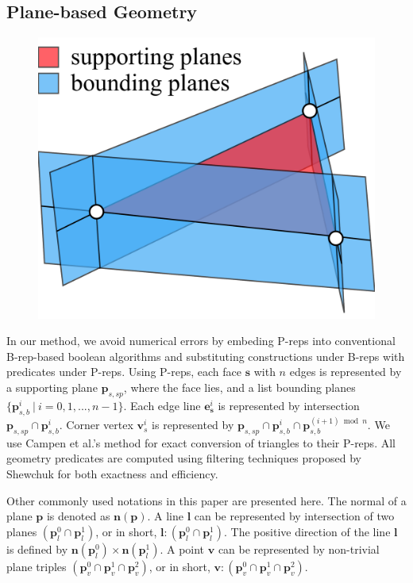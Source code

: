 \documentclass[10pt,journal,compsoc]{IEEEtran}
\begin{document}
\subsection{Plane-based Geometry}

\begin{figure}
\includegraphics[width=1.5 in]{p-reps}
\end{figure}

In our method, we avoid numerical errors by embeding P-reps into conventional B-rep-based boolean algorithms and substituting constructions under B-reps with predicates under P-reps. Using P-reps, each face $\bm{s}$ with $n$ edges is represented by a supporting plane $\bm{p}_{s,sp}$, where the face lies, and a list bounding planes $\{\bm{p}_{s,b}^i \ \vert\  i = 0, 1,...,n-1\}$. Each edge line $\bm{e}_{\bm{s}}^i$ is represented by intersection $\bm{p}_{s,sp} \cap \bm{p}_{s,b}^i$. Corner vertex $\bm{v}_s^i$ is represented by $\bm{p}_{s,sp} \cap \bm{p}_{s,b}^i \cap \bm{p}_{s,b}^{{(i+1)}\bmod{n}}$. We use Campen et al.'s method \cite{campen2010exact} for exact conversion of triangles to their P-reps. All geometry predicates are computed using filtering techniques proposed by Shewchuk \cite{shewchuk1997adaptive} for both exactness and efficiency.


Other commonly used notations in this paper are presented here.
The normal of a plane $\bm{p}$ is denoted as $\bm{n}(\bm{p})$. A line $\bm{l}$ can be represented by intersection of two planes $(\bm{p}_l^0 \cap \bm{p}_l^1)$, or in short, $\bm{l}\colon(\bm{p}_l^0 \cap \bm{p}_l^1)$. The positive direction of the line $\bm{l}$ is defined by $\bm{n}(\bm{p}_l^0) \times \bm{n}(\bm{p}_l^1)$. A point $\bm{v}$ can be represented by non-trivial plane triples $(\bm{p}_v^0 \cap \bm{p}_v^1 \cap \bm{p}_v^2)$, or in short, $\bm{v}\colon(\bm{p}_v^0 \cap \bm{p}_v^1 \cap \bm{p}_v^2)$.
\end{document}
